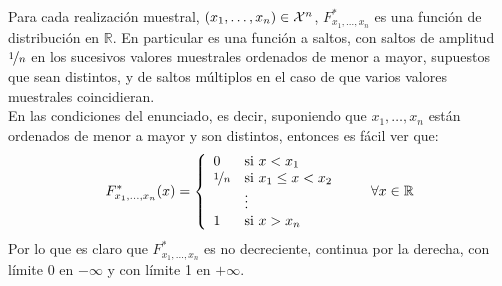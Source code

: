 \begin{ejercicio}
    Para cada realización muestral, $(x_1, \ldots, x_n)\in \mathcal{X}^n$, $F_{x_1,\ldots,x_n}^\ast$ es una función de distribución en $\mathbb{R}$. En particular es una función a saltos, con saltos de amplitud $\nicefrac{1}{n}$ en los sucesivos valores muestrales ordenados de menor a mayor, supuestos que sean distintos, y de saltos múltiplos en el caso de que varios valores muestrales coincidieran.\\

    \noindent
    En las condiciones del enunciado, es decir, suponiendo que $x_1, \ldots, x_n$ están ordenados de menor a mayor y son distintos, entonces es fácil ver que:
    \begin{equation*}
        F_{x_1, \ldots, x_n}^\ast (x) = \left\{\begin{array}{ll}
                0 & \text{si\ } x < x_1 \\
                \nicefrac{1}{n} & \text{si\ } x_1 \leq x < x_2 \\
                                &\vdots \\
                            1 & \text{si\ } x > x_n
        \end{array}\right. \qquad \forall x\in \mathbb{R}
    \end{equation*}
    Por lo que es claro que $F_{x_1, \ldots, x_n}^\ast $ es no decreciente, continua por la derecha, con límite 0 en $-\infty$ y con límite 1 en $+\infty$.
\end{ejercicio}


